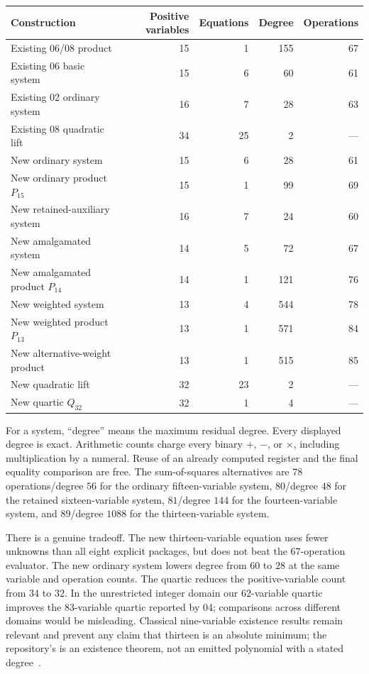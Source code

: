 \documentclass[11pt,a4paper]{article}
\theoremstyle{remark}\newtheorem{remark}[theorem]{Remark}
\newcommand{\src}[1]{\texttt{\detokenize{#1}}}
\begin{document}
\begin{center}\small
\begin{tabular}{lrrrr}
\toprule
Construction & Positive variables & Equations & Degree & Operations\\
\midrule
Existing 06/08 product &15&1&155&67\\
Existing 06 basic system &15&6&60&61\\
Existing 02 ordinary system &16&7&28&63\\
Existing 08 quadratic lift &34&25&2&---\\
\midrule
New ordinary system &15&6&28&61\\
New ordinary product $P_{15}$ &15&1&99&69\\
New retained-auxiliary system &16&7&24&60\\
New amalgamated system &14&5&72&67\\
New amalgamated product $P_{14}$ &14&1&121&76\\
New weighted system &13&4&544&78\\
New weighted product $P_{13}$ &13&1&571&84\\
New alternative-weight product &13&1&515&85\\
New quadratic lift &32&23&2&---\\
New quartic $Q_{32}$ &32&1&4&---\\
\bottomrule
\end{tabular}
\end{center}
For a system, ``degree'' means the maximum residual degree. Every
displayed degree is exact. Arithmetic counts charge every binary
$+$, $-$, or $\times$, including multiplication by a numeral. Reuse of
an already computed register and the final equality comparison are free.
The sum-of-squares alternatives are $78$ operations/degree $56$ for the
ordinary fifteen-variable system, $80$/degree $48$ for the retained
sixteen-variable system, $81$/degree $144$ for the fourteen-variable
system, and $89$/degree $1088$ for the thirteen-variable system.

There is a genuine tradeoff. The new thirteen-variable equation uses fewer
unknowns than all eight explicit packages, but does not beat the
$67$-operation evaluator. The new ordinary system lowers degree from
$60$ to $28$ at the same variable and operation counts. The quartic
reduces the positive-variable count from $34$ to $32$. In the unrestricted
integer domain our $62$-variable quartic improves the $83$-variable
quartic reported by 04; comparisons across different domains would be
misleading. Classical nine-variable existence results remain relevant
and prevent any claim that thirteen is an absolute minimum; the
repository's \src{Jones1982.nine_unknowns} is an existence theorem,
not an emitted polynomial with a stated degree~\cite{nine}.
\end{document}
